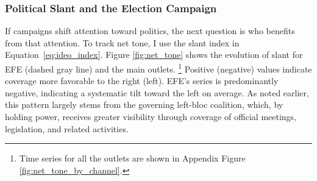 \documentclass[12pt]{article}
\begin{document}
	
	

	

 
	

	

	
		\FloatBarrier
	

\subsubsection*{Political Slant and the Election Campaign}


If campaigns shift attention toward politics, the next question is who benefits from that attention. To track net tone, I use the slant index in Equation~\ref{eq:ideo_index}. Figure \ref{fig:net_tone} shows the  evolution of slant  for  EFE (dashed gray line) and  the main outlets. \footnote{Time series for all the outlets are shown in Appendix Figure \ref{fig:net_tone_by_channel}.} Positive (negative) values indicate coverage more favorable to the right (left).  EFE’s series is predominantly negative, indicating a systematic tilt toward the left on average. As noted earlier, this pattern largely stems from the governing left-bloc coalition, which, by holding power, receives greater visibility through coverage of official meetings, legislation, and related activities.
\end{document}
